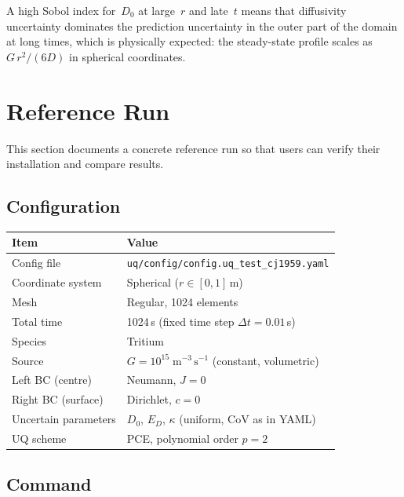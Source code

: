 \documentclass[11pt,a4paper]{article}
\begin{document}
\noindent
A high Sobol index for~$D_0$ at large~$r$ and late~$t$ means that
diffusivity uncertainty dominates the prediction uncertainty in the outer
part of the domain at long times, which is physically expected: the
steady-state profile scales as $G \, r^2 / (6 D)$ in spherical
coordinates.


\section{Reference Run}
\label{sec:refrun}

This section documents a concrete reference run so that users can verify
their installation and compare results.

\subsection{Configuration}

\begin{tabularx}{\textwidth}{@{} l X @{}}
\toprule
\textbf{Item} & \textbf{Value} \\
\midrule
Config file           & \texttt{uq/config/config.uq\_test\_cj1959.yaml} \\
Coordinate system     & Spherical ($r \in [0, 1]$\,m) \\
Mesh                  & Regular, 1024 elements \\
Total time            & 1024\,s (fixed time step $\Delta t = 0.01$\,s) \\
Species               & Tritium \\
Source                & $G = 10^{15}\;\mathrm{m^{-3}\,s^{-1}}$ (constant, volumetric) \\
Left BC (centre)      & Neumann, $J = 0$ \\
Right BC (surface)    & Dirichlet, $c = 0$ \\
Uncertain parameters  & $D_0$, $E_D$, $\kappa$ (uniform, CoV as in YAML) \\
UQ scheme             & PCE, polynomial order $p = 2$ \\
\bottomrule
\end{tabularx}

\subsection{Command}
\end{document}
